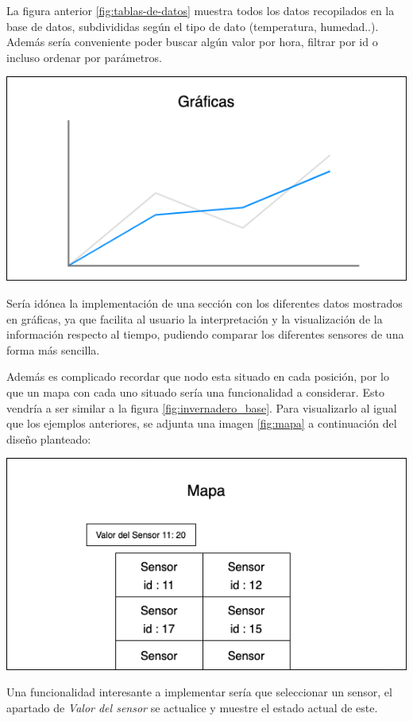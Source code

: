 La figura anterior \ref{fig:tablas-de-datos} muestra todos los datos recopilados en la base de datos, subdivididas según el tipo de dato (temperatura, humedad..). Además sería conveniente poder buscar algún valor por hora, filtrar por id o incluso ordenar por parámetros.

\begin{center}
    \centering
    \includegraphics[width=\textwidth]{img/05-Web-charts.png}
    \label{fig:graficas}
\end{center}

Sería idónea la implementación de una sección con los diferentes datos mostrados en gráficas, ya que facilita al usuario la interpretación y la visualización de la información respecto al tiempo, pudiendo comparar los diferentes sensores de una forma más sencilla.

 Además es complicado recordar que nodo esta situado en cada posición, por lo que un mapa con cada uno situado sería una funcionalidad a considerar. Esto vendría a ser similar a la figura \ref{fig:invernadero_base}. Para visualizarlo al igual que los ejemplos anteriores, se adjunta una imagen \ref{fig:mapa} a continuación del diseño planteado:
 
 \newpage
 
 \begin{center}
    \centering
    \includegraphics[width=\textwidth]{img/05-Web-map.png}
    \label{fig:mapa}
\end{center}

Una funcionalidad interesante a implementar sería que seleccionar un sensor, el apartado de \textit{Valor del sensor} se actualice y muestre el estado actual de este.